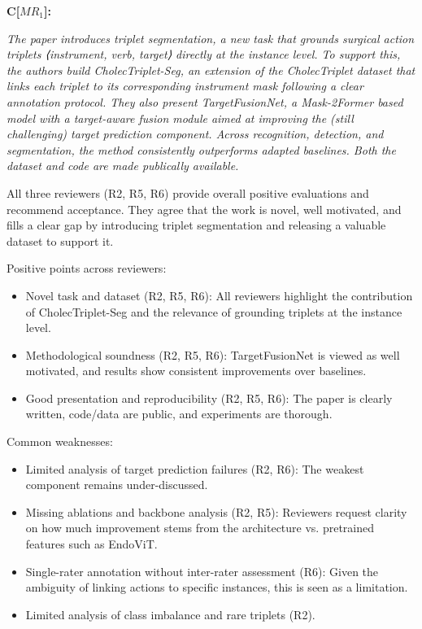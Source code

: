 \documentclass{article}
\begin{document}
\textbf{C[$MR_{1}$]:} {\it
The paper introduces triplet segmentation, a new task that grounds surgical action triplets ⟨instrument, verb, target⟩ directly at the instance level. To support this, the authors build CholecTriplet-Seg, an extension of the CholecTriplet dataset that links each triplet to its corresponding instrument mask following a clear annotation protocol. They also present TargetFusionNet, a Mask-2Former based model with a target-aware fusion module aimed at improving the (still challenging) target prediction component. Across recognition, detection, and segmentation, the method consistently outperforms adapted baselines. Both the dataset and code are made publically available.

All three reviewers (R2, R5, R6) provide overall positive evaluations and recommend acceptance. They agree that the work is novel, well motivated, and fills a clear gap by introducing triplet segmentation and releasing a valuable dataset to support it.

Positive points across reviewers:
\begin{itemize}[noitemsep,nolistsep]
\item Novel task and dataset (R2, R5, R6): All reviewers highlight the contribution of CholecTriplet-Seg and the relevance of grounding triplets at the instance level.
\item Methodological soundness (R2, R5, R6): TargetFusionNet is viewed as well motivated, and results show consistent improvements over baselines.
\item Good presentation and reproducibility (R2, R5, R6): The paper is clearly written, code/data are public, and experiments are thorough.
\end{itemize}

Common weaknesses:
\begin{itemize}[noitemsep,nolistsep]
\item Limited analysis of target prediction failures (R2, R6): The weakest component remains under-discussed.
\item Missing ablations and backbone analysis (R2, R5): Reviewers request clarity on how much improvement stems from the architecture vs. pretrained features such as EndoViT.
\item Single-rater annotation without inter-rater assessment (R6): Given the ambiguity of linking actions to specific instances, this is seen as a limitation.
\item Limited analysis of class imbalance and rare triplets (R2).
\end{itemize}
\vspace{2mm}
}
\end{document}
